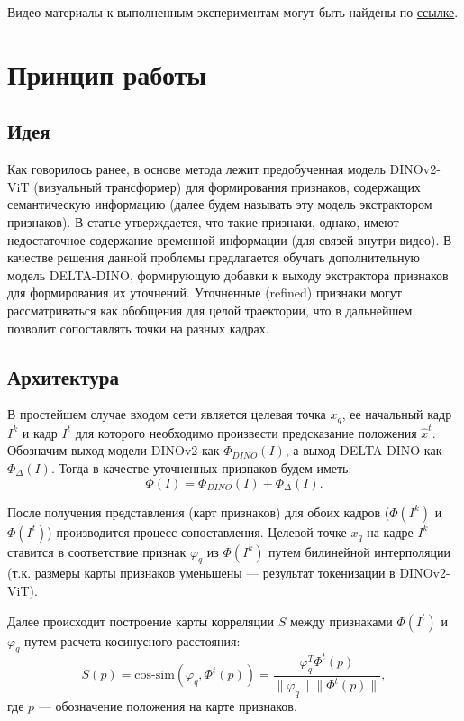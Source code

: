 \documentclass[a4paper, 14pt]{extarticle}
\theoremstyle{definition}
\theoremstyle{plain}
\theoremstyle{remark}
\begin{document}
Видео-материалы к выполненным экспериментам могут быть найдены по \href{https://drive.google.com/drive/folders/1OhjDO-olEEyySXN8FETYPrz6gLZjzuJF?usp=drive_link}{ссылке}.

\newpage

\section{Принцип работы}
\subsection{Идея}
Как говорилось ранее, в основе метода лежит предобученная модель DINOv2-ViT (визуальный трансформер) для формирования признаков, содержащих семантическую информацию (далее будем называть эту модель экстрактором признаков). 
В статье утверждается, что такие признаки, однако, имеют недостаточное содержание временной информации (для связей внутри видео). В качестве решения данной проблемы предлагается обучать дополнительную модель DELTA-DINO, формирующую добавки к выходу экстрактора признаков для формирования их уточнений. Уточненные (refined) признаки могут рассматриваться как обобщения для целой траектории, что в дальнейшем позволит сопоставлять точки на разных кадрах.

\subsection{Архитектура}
В простейшем случае входом сети является целевая точка $x_q$, ее начальный кадр $I^k$ и кадр $I^t$ для которого необходимо произвести предсказание положения $\hat{x}^t$. Обозначим выход модели DINOv2 как $\Phi_{DINO}(I)$, а выход DELTA-DINO как $\Phi_{\Delta}(I)$. Тогда в качестве уточненных признаков будем иметь:
\begin{equation}
	\Phi(I) = \Phi_{DINO}(I) + \Phi_{\Delta}(I).
\end{equation}

После получения представления (карт признаков) для обоих кадров ($\Phi(I^k)$ и $\Phi(I^t)$) производится процесс сопоставления. Целевой точке $x_q$ на кадре $I^k$ ставится в соответствие признак $\varphi_q$ из $\Phi(I^k)$ путем билинейной интерполяции (т.к. размеры карты признаков уменьшены --- результат токенизации в DINOv2-ViT).

Далее происходит построение карты корреляции $S$ между признаками $\Phi(I^t)$ и $\varphi_q$ путем расчета косинусного расстояния:
\begin{equation}
	S(p) = \text{cos-sim}(\varphi_q, \Phi^t(p))= \frac{\varphi_q^T \Phi^t(p)}{\|\varphi_q\|\|\Phi^t(p)\|},
\end{equation}
где $p$ --- обозначение положения на карте признаков.
\end{document}
